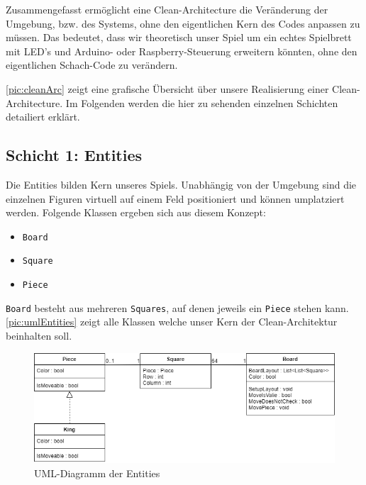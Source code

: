 \documentclass[
10pt, %
a4paper, %
oneside, %
headinclude,footinclude, %
BCOR5mm, %
]{scrartcl}
\begin{document}
\begin{onehalfspace}
Zusammengefasst ermöglicht eine Clean-Architecture die Veränderung der Umgebung, bzw. des Systems, ohne den eigentlichen Kern des Codes anpassen zu müssen.
Das bedeutet, dass wir theoretisch unser Spiel um ein echtes Spielbrett mit LED's und Arduino- oder Raspberry-Steuerung erweitern könnten, ohne den eigentlichen Schach-Code zu verändern.

\autoref{pic:cleanArc} zeigt eine grafische Übersicht über unsere Realisierung einer Clean-Architecture. Im Folgenden werden die hier zu sehenden einzelnen Schichten detailiert erklärt.

\newpage
\subsection{Schicht 1: Entities}
Die Entities bilden Kern unseres Spiels. Unabhängig von der Umgebung sind die einzelnen Figuren virtuell auf einem Feld positioniert und können umplatziert werden.
Folgende Klassen ergeben sich aus diesem Konzept: 

\begin{center}
	\begin{itemize}
		\item \texttt{Board}
		\item \texttt{Square}
		\item \texttt{Piece}
	\end{itemize}
\end{center}

\texttt{Board} besteht aus mehreren \texttt{Squares}, auf denen jeweils ein \texttt{Piece} stehen kann. \autoref{pic:umlEntities} zeigt alle Klassen welche unser Kern der Clean-Architektur beinhalten soll. 
\vspace{0.4cm}
\begin{figure}[h]
	\begin{center}
		\includegraphics[width=13cm]{entities.png}
		\caption{\label{pic:umlEntities} UML-Diagramm der Entities}
	\end{center}
\end{figure}


\end{onehalfspace}
\end{document}
